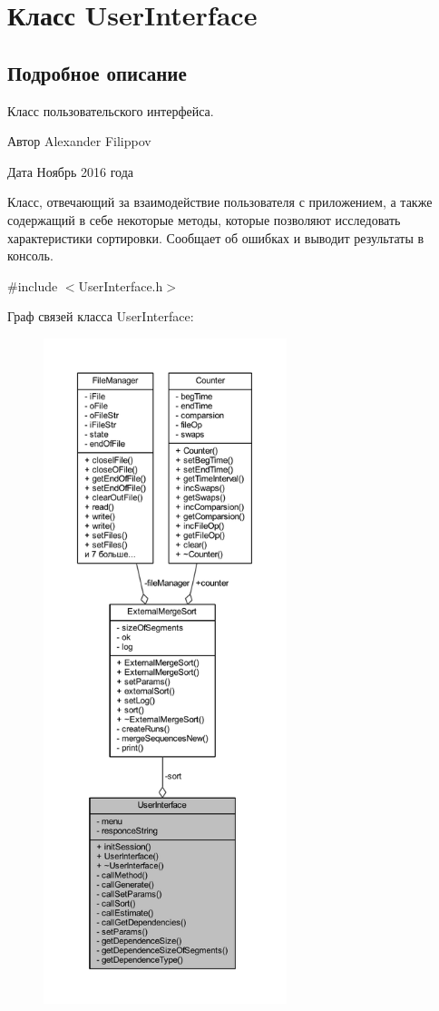 \hypertarget{class_user_interface}{}\section{Класс User\+Interface}
\label{class_user_interface}


\subsection{Подробное описание}
Класс пользовательского интерфейса. 

\begin{DoxyAuthor}{Автор}
Alexander Filippov 
\end{DoxyAuthor}
\begin{DoxyDate}{Дата}
Ноябрь 2016 года
\end{DoxyDate}
Класс, отвечающий за взаимодействие пользователя с приложением, а также содержащий в себе некоторые методы, которые позволяют исследовать характеристики сортировки. Сообщает об ошибках и выводит результаты в консоль. 

{\ttfamily \#include $<$User\+Interface.\+h$>$}



Граф связей класса User\+Interface\+:\nopagebreak
\begin{figure}[H]
\begin{center}
\leavevmode
\includegraphics[height=550pt]{class_user_interface__coll__graph}
\end{center}
\end{figure}
